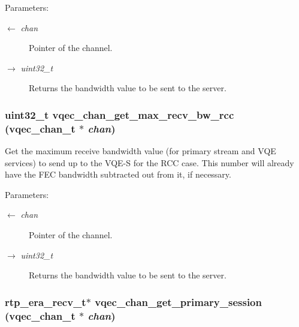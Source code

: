 \begin{Desc}
\item[Parameters:]
\begin{description}
\item[\mbox{$\leftarrow$} {\em chan}]Pointer of the channel. \item[\mbox{$\rightarrow$} {\em uint32\_\-t}]Returns the bandwidth value to be sent to the server. \end{description}
\end{Desc}
\subsubsection{\setlength{\rightskip}{0pt plus 5cm}uint32\_\-t vqec\_\-chan\_\-get\_\-max\_\-recv\_\-bw\_\-rcc (\bf{vqec\_\-chan\_\-t} $\ast$ {\em chan})}\label{vqec__channel__private_8h_edabfea9482ae374c47654479fbad4b2}


Get the maximum receive bandwidth value (for primary stream and VQE services) to send up to the VQE-S for the RCC case. This number will already have the FEC bandwidth subtracted out from it, if necessary.

\begin{Desc}
\item[Parameters:]
\begin{description}
\item[\mbox{$\leftarrow$} {\em chan}]Pointer of the channel. \item[\mbox{$\rightarrow$} {\em uint32\_\-t}]Returns the bandwidth value to be sent to the server. \end{description}
\end{Desc}
\subsubsection{\setlength{\rightskip}{0pt plus 5cm}\bf{rtp\_\-era\_\-recv\_\-t}$\ast$ vqec\_\-chan\_\-get\_\-primary\_\-session (\bf{vqec\_\-chan\_\-t} $\ast$ {\em chan})}\label{vqec__channel__private_8h_0e839faf967bcd4892c8a1a953823b09}


